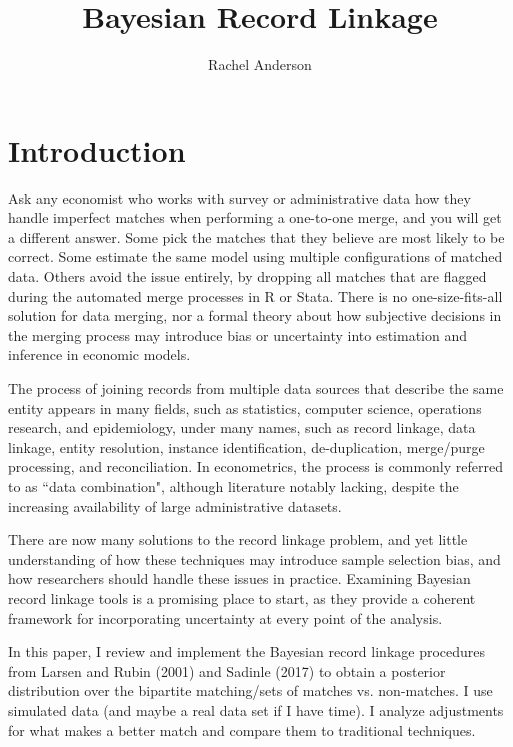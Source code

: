 \documentclass[11pt,reqno]{amsart}
\title{Bayesian Record Linkage}
\author{Rachel Anderson}
\begin{document}
\vspace*{-1cm}
\maketitle



\section{Introduction}

Ask any economist who works with survey or administrative data how they handle imperfect matches when performing a one-to-one merge, and you will get a different answer.  Some pick the matches that they believe are most likely to be correct.  Some estimate the same model using multiple configurations of matched data.  Others avoid the issue entirely, by dropping all matches that are flagged during the automated merge processes in R or Stata.  There is no one-size-fits-all solution for data merging, nor a formal theory about how subjective decisions in the merging process may introduce bias or uncertainty into estimation and inference in economic models. 

The process of joining records from multiple data sources that describe the same entity appears in many fields, such as statistics, computer science, operations research, and epidemiology, under many names, such as record linkage, data linkage, entity resolution, instance identification, de-duplication, merge/purge processing, and reconciliation.    In econometrics, the process is commonly referred to as ``data combination", although literature notably lacking, despite the increasing availability of large administrative datasets.  %

There are now many solutions to the record linkage problem, and yet little understanding of how these techniques may introduce sample selection bias, and how researchers should handle these issues in practice.  Examining Bayesian record linkage tools is a promising place to start, as they provide a coherent framework for incorporating uncertainty at every point of the analysis.  

In this paper, I review and implement the Bayesian record linkage procedures from Larsen and Rubin (2001) and Sadinle (2017) to obtain a posterior distribution over the bipartite matching/sets of matches vs. non-matches. I use simulated data (and maybe a real data set if I have time).  I analyze adjustments for what makes a better match and compare them to traditional techniques.
\end{document}
